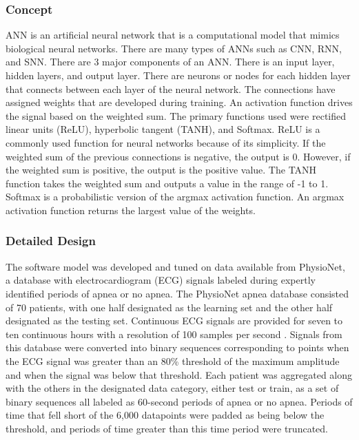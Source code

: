 \documentclass[12pt,titlepage]{article}
\begin{document}
\subsubsection{Concept}
ANN is an artificial neural network that is a computational model that mimics biological neural networks. There are many types of ANNs such as CNN, RNN, and SNN. There are 3 major components of an ANN. There is an input layer, hidden layers, and output layer. There are neurons or nodes for each hidden layer that connects between each layer of the neural network. The connections have assigned weights that are developed during training. An activation function drives the signal based on the weighted sum. The primary functions used were rectified linear units (ReLU), hyperbolic tangent (TANH), and Softmax. ReLU is a commonly used function for neural networks because of its simplicity. If the weighted sum of the previous connections is negative, the output is 0. However, if the weighted sum is positive, the output is the positive value. The TANH function takes the weighted sum and outputs a value in the range of -1 to 1. Softmax is a probabilistic version of the argmax activation function. An argmax activation function returns the largest value of the weights.

\subsubsection{Detailed Design}
The software model was developed and tuned on data available from PhysioNet, a database with electrocardiogram (ECG) signals labeled during expertly 
identified periods of apnea or no apnea. The PhysioNet apnea database consisted of 70 patients, with one half designated as the learning
set and the other half designated as the testing set. Continuous ECG signals are provided for seven to ten continuous hours with a resolution of 100 samples 
per second \cite{physiobank}. Signals from this database were converted into binary sequences corresponding to points when the ECG signal was greater than
an 80\% threshold of the maximum amplitude and when the signal was below that threshold. Each patient was aggregated along with the others in the designated
data category, either test or train, as a set of binary sequences all labeled as 60-second periods of apnea or no apnea. Periods of time that fell short of the
6,000 datapoints were padded as being below the threshold, and periods of time greater than this time period were truncated.
\end{document}
